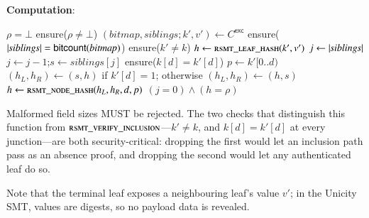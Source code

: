 \textbf{Computation}:
\begin{algorithmic}
		 \Return $\rho=\bot$  \EndIf
		\State ensure($\rho\ne\bot$)
		\State $(\mathit{bitmap},\mathit{siblings};k',v') \gets C^\mathsf{exc}$
		\State ensure($\left|\mathit{siblings}\right|=\mathsf{bitcount}(\mathit{bitmap})$)
		\State ensure($k'\ne k$) 
		\State $h \gets \Call{rsmt\_leaf\_hash}{k',v'}$
		\State $j \gets \left|\mathit{siblings}\right|$
			\State $j \gets j-1$;\quad $s \gets \mathit{siblings}[j]$
			\State ensure($k[d]=k'[d]$) 
			\State $p \gets k'[0..d)$ 
			\State $(h_L,h_R)\gets(s,h)$ if $k'[d]=1$; otherwise $(h_L,h_R)\gets(h,s)$
			\State $h\gets\Call{rsmt\_node\_hash}{h_L,h_R,d,p}$
		\EndFor
		\State \Return $(j=0)\land(h=\rho)$
	\EndFunction
\end{algorithmic}

Malformed field sizes MUST be rejected. The two checks that distinguish this function from $\textsc{rsmt\_verify\_inclusion}$---$k'\ne k$, and $k[d]=k'[d]$ at every junction---are both security-critical: dropping the first would let an inclusion path pass as an absence proof, and dropping the second would let any authenticated leaf do so.

Note that the terminal leaf exposes a neighbouring leaf's value $v'$; in the Unicity SMT, values are digests, so no payload data is revealed.



